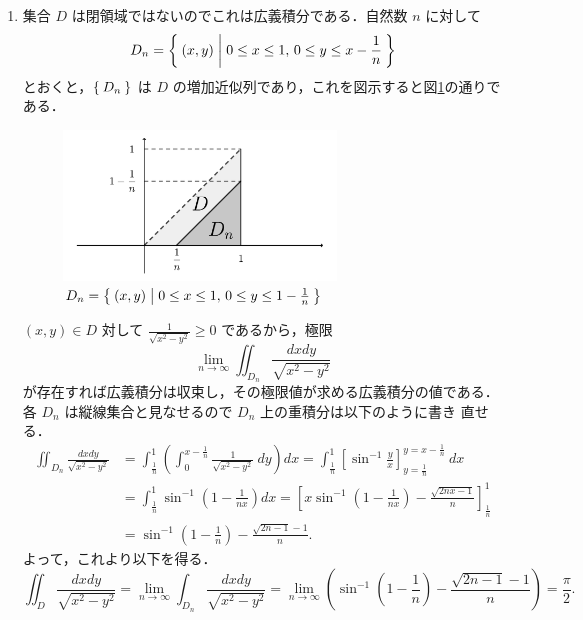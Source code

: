 \documentclass[11pt, uplatex, dvipdfmx]{jsarticle}
\begin{document}
\begin{enumerate}[(1)]
   \item 集合 $D$ は閉領域ではないのでこれは広義積分である．自然数 $n$ に対して
     \[
       D_n=\Set{ (x,y)  |  0 \leq x \leq 1, \, 0 \leq y \leq x-\frac{1}{n}}
     \]
     とおくと，$\Set{D_n}$ は $D$ の増加近似列であり，これを図示すると図\ref{fig:no20}の通りである．
     \begin{figure}[h]
       \centering
       \includegraphics[height=4cm]{./pictures/no20.pdf}
       \caption{ $D_n=\Set{(x,y)  |  0 \leq x \leq 1, \, 0 \leq y \leq 1-\frac{1}{n}}$}\label{fig:no20}
     \end{figure}

     $(x,y) \in D$ 対して $\frac{1}{\sqrt{x^2-y^2}} \geq0$ であるから，極限
     \[
       \lim_{n \to \infty} \iint_{D_n} \frac{dxdy}{\sqrt{x^2-y^2}}
     \]
     が存在すれば広義積分は収束し，その極限値が求める広義積分の値である．
     各 $D_n$ は縦線集合と見なせるので $D_n$ 上の重積分は以下のように書き
     直せる．
     \begin{align*}
       \iint_{D_n} \frac{dxdy}{\sqrt{x^2-y^2}}
       &= \int^{1}_{\frac{1}{n}}
         \left( \int_{0}^{x-\frac{1}{n}} \frac{1}{\sqrt{x^2-y^2}} \ dy \right) dx
         = \int^{1}_{\frac{1}{n}} \left[ \sin^{-1} \frac{y}{x} \right]_{y={\frac{1}{n}}}^{y=x-\frac{1}{n}} \ dx\\
       &= \int^{1}_{\frac{1}{n}} \sin^{-1}\left(1-\frac{1}{nx}\right) dx
         = \left[ x \sin^{-1} \left(1-\frac{1}{nx}\right) - \frac{ \sqrt{2nx-1}}{n} \right]^{1}_{\frac{1}{n}}\\
       &= \sin^{-1}\left(1-\frac{1}{n}\right) - \frac{\sqrt{2n-1}-1}{n}.
     \end{align*}
     よって，これより以下を得る．
     \[
       \iint_{D} \frac{dxdy}{\sqrt{x^2-y^2}} = \lim_{n \to \infty} \int_{D_n}\frac{dxdy}{\sqrt{x^2-y^2}}
       = \lim_{n \to \infty} \left( \sin^{-1}\left(1-\frac{1}{n}\right) - \frac{\sqrt{2n-1}-1}{n}\right) 
       = \frac{\pi}{2}.
     \]


\end{enumerate}
\end{document}
